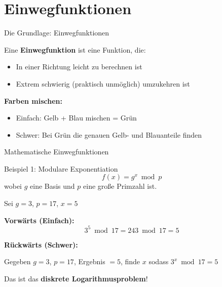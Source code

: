 \documentclass[handout]{beamer}
\begin{document}
\section{Einwegfunktionen}

\begin{frame}{Die Grundlage: Einwegfunktionen}
\begin{definition}
Eine \textbf{Einwegfunktion} ist eine Funktion, die:
\begin{itemize}
    \item In einer Richtung leicht zu berechnen ist
    \item Extrem schwierig (praktisch unmöglich) umzukehren ist
\end{itemize}
\end{definition}

\pause

\begin{example}
\textbf{Farben mischen:}
\begin{itemize}
    \item \textcolor{green!60!black}{Einfach:} Gelb + Blau mischen = Grün
    \item \textcolor{red!60!black}{Schwer:} Bei Grün die genauen Gelb- und Blauanteile finden
\end{itemize}
\end{example}
\end{frame}

\begin{frame}{Mathematische Einwegfunktionen}
\begin{block}{Beispiel 1: Modulare Exponentiation}
\[
f(x) = g^x \bmod p
\]
wobei $g$ eine Basis und $p$ eine große Primzahl ist.
\end{block}

\pause

\begin{example}
Sei $g = 3$, $p = 17$, $x = 5$

\textbf{Vorwärts (Einfach):}
\[
3^5 \bmod 17 = 243 \bmod 17 = 5
\]

\pause

\textbf{Rückwärts (Schwer):}

Gegeben $g = 3$, $p = 17$, Ergebnis $= 5$, finde $x$ sodass $3^x \bmod 17 = 5$

Das ist das \textbf{diskrete Logarithmusproblem}!
\end{example}
\end{frame}
\end{document}
